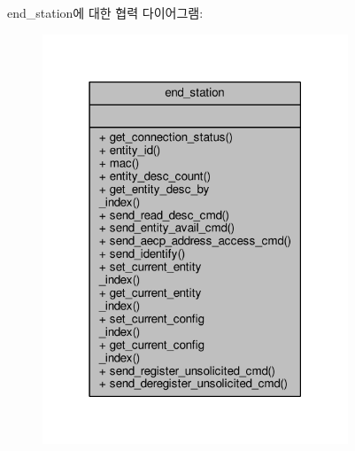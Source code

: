 end\+\_\+station에 대한 협력 다이어그램\+:
\nopagebreak
\begin{figure}[H]
\begin{center}
\leavevmode
\includegraphics[width=259pt]{classavdecc__lib_1_1end__station__coll__graph}
\end{center}
\end{figure}
